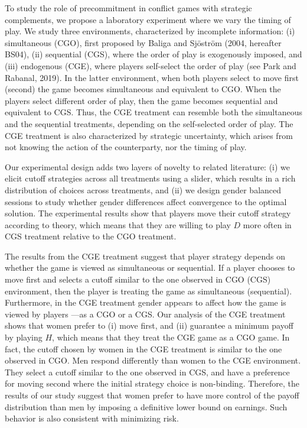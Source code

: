 \documentclass[12pt, letterpaper]{article}
\theoremstyle{plain}
\begin{document}
To study the role of precommitment in conflict games with strategic complements, we propose a laboratory experiment where we vary the timing of play.  We study three environments, characterized by incomplete information: (i) simultaneous (CGO), first proposed by Baliga and
Sj\"ostr\"om (2004, hereafter BS04), (ii) sequential (CGS), where the order of play is exogenously imposed, and (iii) endogenous (CGE), where players self-select the order of play (see Park and Rabanal, 2019). In the latter environment, when both players select to move first (second) the game becomes simultaneous and equivalent to CGO. When the players select different order of play, then the game becomes sequential and equivalent to CGS. Thus, the CGE treatment can resemble both the simultaneous and the sequential treatments, depending on the self-selected order of play. The CGE treatment is also characterized by strategic uncertainty, which arises from not knowing the action of the counterparty, nor the timing of play. 

Our experimental design adds two layers of novelty to related literature: (i) we elicit cutoff strategies across all treatments using a slider, which results in a rich distribution of choices across treatments, and (ii) we design gender balanced sessions to study whether gender differences affect convergence to the optimal solution. The experimental results show that players move their cutoff strategy according to theory, which means that they are willing to play $D$ more often in CGS treatment relative to the CGO treatment.

The results from the CGE treatment suggest that player strategy depends on whether the game is viewed as simultaneous or sequential. If a player chooses to move first and selects a cutoff similar to the one observed in CGO (CGS) environment, then the player is treating the game as simultaneous (sequential). Furthermore, in the CGE treatment gender appears to affect how the game is viewed by players ---as a CGO or a CGS. Our analysis of the CGE treatment shows that women prefer to (i) move first, and (ii) guarantee a minimum payoff by playing $H$, which means that they treat the CGE game as a CGO game. In fact, the cutoff chosen by women in the CGE treatment is similar to the one observed in CGO. Men respond differently than women to the CGE environment. They select a cutoff similar to the one observed in CGS, and have a preference for moving second where the initial strategy choice is non-binding. Therefore, the results of our study suggest that women prefer to have more control of the payoff distribution than men by imposing a definitive lower bound on earnings. Such behavior is also consistent with minimizing risk.
\end{document}
